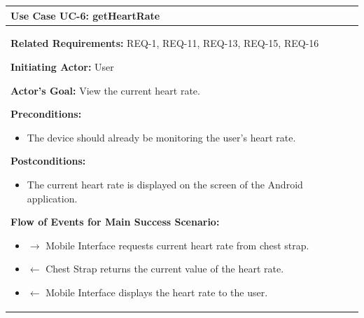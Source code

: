 \documentclass[letterpaper,english, 12pt]{scrreprt}
\begin{document}
\begin{center}
        \begin{tabular}{|C{15cm}|}
                \hline
                        \textbf{Use Case UC-6: getHeartRate}\\
                \hline
                        \begin{flushleft}
                                \textbf{Related Requirements: } REQ-1, REQ-11, REQ-13, REQ-15, REQ-16
                        \end{flushleft}
                        \begin{flushleft}
                                \textbf{Initiating Actor: } User
                        \end{flushleft}
                        \begin{flushleft}
                                \textbf{Actor's Goal: } View the current heart rate.
                        \end{flushleft}
                        \begin{flushleft}
                                \textbf{Preconditions: }
                        \end{flushleft}
                                \begin{itemize}
                                        \item The device should already be monitoring the user's heart rate.
                                \end{itemize}
                        \begin{flushleft}
                                \textbf{Postconditions: }
                        \end{flushleft}
                                \begin{itemize}
                                        \item The current heart rate is displayed on the screen of the Android application.
                                \end{itemize}
                        \begin{flushleft}
                                \textbf{Flow of Events for Main Success Scenario: }
                        \end{flushleft}
                                \begin{itemize}
                                        \item[] $\rightarrow$ Mobile Interface requests current heart rate from chest strap.
                                        \item[] $\leftarrow$ Chest Strap returns the current value of the heart rate. 
                                        \item[] $\leftarrow$ Mobile Interface displays the heart rate to the user.
                                \end{itemize}
				\\
                \hline
        \end{tabular}
\end{center}
\end{document}
